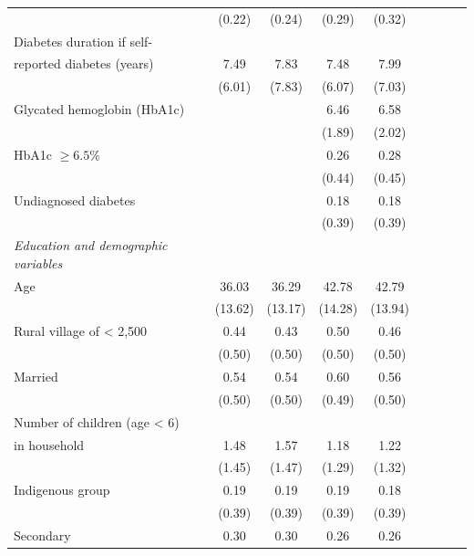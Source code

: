 \begin{table}[p]
\begin{adjustbox}{max width=\linewidth, center}
\begin{threeparttable}
{\begin{tabular}{l*{4}{SS}}
                    &      (0.22)&      (0.24)&      (0.29)&      (0.32)\\
Diabetes duration if self- &&&&\\
reported diabetes (years)   &        7.49&        7.83&        7.48&        7.99\\
                    &      (6.01)&      (7.83)&      (6.07)&      (7.03)\\
Glycated hemoglobin (HbA1c)&            &            &       6.46&        6.58\\
                    &            &            &      (1.89)&      (2.02)\\
HbA1c $\geq 6.5\%$  &            &            &        0.26&        0.28\\
                    &            &            &      (0.44)&      (0.45)\\
Undiagnosed diabetes&            &            &        0.18&        0.18\\
                    &            &            &      (0.39)&      (0.39)\\
\hspace*{10mm}\emph{Education and demographic variables} \\
Age                 &       36.03&       36.29&       42.78&       42.79\\
                    &     (13.62)&     (13.17)&     (14.28)&     (13.94)\\
Rural village of < 2,500&        0.44&        0.43&        0.50&        0.46\\
                    &      (0.50)&      (0.50)&      (0.50)&      (0.50)\\
Married             &        0.54&        0.54&        0.60&        0.56\\
                    &      (0.50)&      (0.50)&      (0.49)&      (0.50)\\
Number of children (age < 6) &&&&\\
in household&        1.48&        1.57&        1.18&        1.22\\
                    &      (1.45)&      (1.47)&      (1.29)&      (1.32)\\
Indigenous group    &        0.19&        0.19&        0.19&        0.18\\
                    &      (0.39)&      (0.39)&      (0.39)&      (0.39)\\
Secondary           &        0.30&        0.30&        0.26&        0.26\\

\end{tabular}}
\end{threeparttable}
\end{adjustbox}
\end{table}
